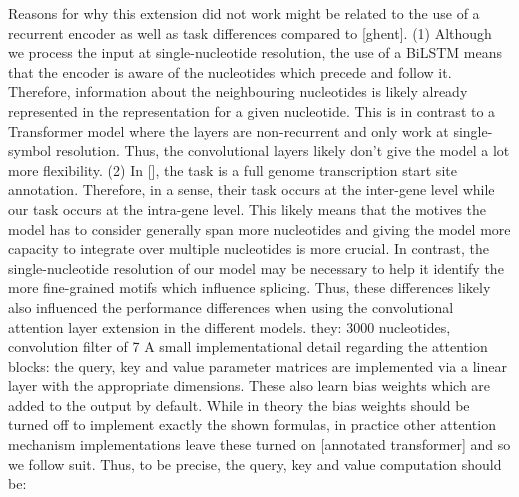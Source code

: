 Reasons for why this extension did not work might be related to the use of a recurrent encoder as well as task differences compared to [ghent].
(1) Although we process the input at single-nucleotide resolution, the use of a BiLSTM means that the encoder is aware of the nucleotides which precede and follow it. Therefore, information about the neighbouring nucleotides is likely already represented in the representation for a given nucleotide. This is in contrast to a Transformer model where the layers are non-recurrent and only work at single-symbol resolution. Thus, the convolutional layers likely don't give the model a lot more flexibility.
(2) In [], the task is a full genome transcription start site annotation. Therefore, in a sense, their task occurs at the inter-gene level while our task occurs at the intra-gene level. This likely means that the motives the model has to consider generally span more nucleotides and giving the model more capacity to integrate over multiple nucleotides is more crucial. In contrast, the single-nucleotide resolution of our model may be necessary to help it identify the more fine-grained motifs which influence splicing. Thus, these differences likely also influenced the performance differences when using the convolutional attention layer extension in the different models.
they: 3000 nucleotides, convolution filter of 7
A small implementational detail regarding the attention blocks: the query, key and value parameter matrices are implemented via a linear layer with the appropriate dimensions. These also learn bias weights which are added to the output by default. While in theory the bias weights should be turned off to implement exactly the shown formulas, in practice other attention mechanism implementations leave these turned on [annotated transformer] and so we follow suit. Thus, to be precise, the query, key and value computation should be:

